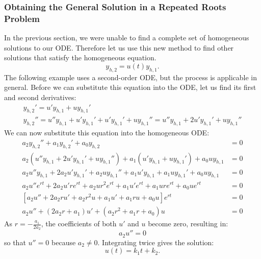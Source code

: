 \documentclass{article}
\begin{document}
\subsubsection{Obtaining the General Solution in a Repeated Roots Problem}
In the previous section, we were unable to find a complete set of homogeneous solutions to our ODE.
Therefore let us use this new method to find other solutions that satisfy the homogeneous equation.
\begin{equation*}
    y_{h,2} = u\left( t \right) y_{h,1}.
\end{equation*}
The following example uses a second-order ODE, but the process is applicable in general.
Before we can substitute this equation into the ODE, let us find its first and second derivatives:
\begin{gather*}
    y_{h,2}' = u' y_{h,1} + u y_{h,1}' \\
    y_{h,2}'' = u'' y_{h,1} + u' y_{h,1}' + u' y_{h,1}' + u y_{h,1}'' = u'' y_{h,1} + 2u' y_{h,1}' + u y_{h,1}''
\end{gather*}
We can now substitute this equation into the homogeneous ODE:
\begin{align*}
    a_2 y_{h,2}'' + a_1 y_{h,2}' + a_0 y_{h,2}                                                                               & = 0 \\
    a_2 \left( u'' y_{h,1} + 2u' y_{h,1}' + u y_{h,1}'' \right) + a_1 \left( u' y_{h,1} + u y_{h,1}' \right) + a_0 u y_{h,1} & = 0 \\
    a_2 u'' y_{h,1} + 2a_2 u' y_{h,1}' + a_2 u y_{h,1}'' + a_1 u' y_{h,1} + a_1 u y_{h,1}' + a_0 u y_{h,1}                   & = 0 \\
    a_2 u'' e^{rt} + 2a_2 u' r e^{rt} + a_2 u r^2 e^{rt} + a_1 u' e^{rt} + a_1 u r e^{rt} + a_0 u e^{rt}                     & = 0 \\
    \left[ a_2 u'' + 2a_2 r u' + a_2 r^2 u + a_1 u' + a_1 r u + a_0 u \right] e^{rt}                                         & = 0 \\
    a_2 u'' + \left( 2a_2 r + a_1 \right) u' + \left( a_2 r^2 + a_1 r + a_0 \right) u                                        & = 0
\end{align*}
As \(r = -\frac{a_1}{2a_2}\), the coefficients of both \(u'\) and \(u\) become zero, resulting in:
\begin{equation*}
    a_2 u'' = 0
\end{equation*}
so that \(u'' = 0\) because \(a_2 \neq 0\). Integrating twice gives the solution:
\begin{equation*}
    u\left( t \right) = k_1t + k_2.
\end{equation*}
\end{document}
